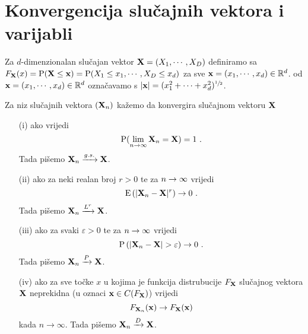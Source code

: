 \section{Konvergencija slučajnih vektora i varijabli}

Za $d$-dimenzionalan slučajan vektor 
$\tsvek{X} = (\tsvar{X_1},\cdots,\tsvar{X_d})$
definiramo sa
$F_{\tsvek{X}}(x) = 
\vP( \tsvek{X} \leq \tv{x} ) =
\vP( \tsvar{X_1} \leq x_1, \cdots, \tsvar{X_d} \leq x_d)$
za sve $\tv{x}=(x_1,\cdots,x_d) \in \mathbb{R}^d$. 
od $\tv{x}=(x_1,\cdots,x_d) \in \mathbb{R}^d$
označavamo s $|\tv{x}| = (x_{1}^{2}+\cdots+x_{d}^{2})^{\sfrac{1}{2}}$.

\begin{defn}
	Za niz slučajnih vektora $(\tsvek{X}_n)$ kažemo da 
	konvergira slučajnom vektoru $\tsvek{X}$
%
\begin{itemize}
	\item[(i)]{
		ako vrijedi
		\begin{equation} \label{equ:konvgs}
			\vP( \lim_{n \rightarrow \infty} \tsvek{X}_n = \tsvek{X}) = 1\ .
		\end{equation}
		Tada pišemo $\konvgs{\tsvek{X}_n}{\tsvek{X}}$.
	}
	\item[(ii)]{
		ako za neki realan broj $r>0$ te za $n \rightarrow \infty$ vrijedi
		\begin{equation}\label{equ:konvusr}
			\vE{| \tsvek{X}_n - \tsvek{X} |^r}  \rightarrow 0\ .
		\end{equation}
		Tada pišemo $\konvusr{\tsvek{X}_n}{\tsvek{X}}{r}$.
	}
	\item[(iii)]{
		ako za svaki $\varepsilon >0$ te za $n \rightarrow \infty$ vrijedi
		\begin{equation}\label{equ:konvpv}
			\vP \left( | \tsvek{X}_n - \tsvek{X} | > 
			\varepsilon \right) \rightarrow 0 \ .
		\end{equation}
		Tada pišemo $\konvpv{\tsvek{X}_n}{\tsvek{X}}$.
	}
	\item[(iv)]{
		ako za sve točke $x$ u kojima je funkcija distrubucije
		$F_{\tsvek{X}}$ slučajnog vektora $\tsvek{X}$ 
		neprekidna (u oznaci $\tv{x} \in C(F_{\tsvek{X}})$) vrijedi
		\begin{equation} \label{equ:konvpd}
			F_{\tsvek{X}_n}(\tv{x}) \rightarrow F_{\tsvek{X}}(\tv{x})
		\end{equation}
		kada $n \rightarrow \infty$. Tada pišemo $\konvpd{\tsvek{X}_n}{\tsvek{X}}$.
	}
\end{itemize}
\end{defn}

